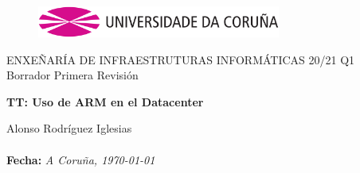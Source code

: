 \documentclass[a4paper,openright,12pt]{article}
\begin{document}
\clearpage

\begin{titlepage}

\begin{center}
\vspace*{-1in}
\vspace{3.5cm}
\begin{figure}[htb]
\begin{center}
\includegraphics[width=8cm]{img/udc.eps}
\end{center}
\end{figure}

\vspace*{1in}
\title {}
ENXEÑARÍA DE INFRAESTRUTURAS INFORMÁTICAS 20/21 Q1\\
Borrador Primera Revisión\\
\vspace*{0.5in}
\begin{Large}
\textbf{TT: Uso de ARM en el Datacenter}\\
\end{Large}

\vspace*{10cm}

\begin{large}
\raggedleft{}
Alonso Rodríguez Iglesias\\

\textbf{\\Fecha:}\emph{ A Coruña, \today}\\
\end{large}

\end{center}
\end{titlepage} 

\newpage


%

\tableofcontents
\end{document}
